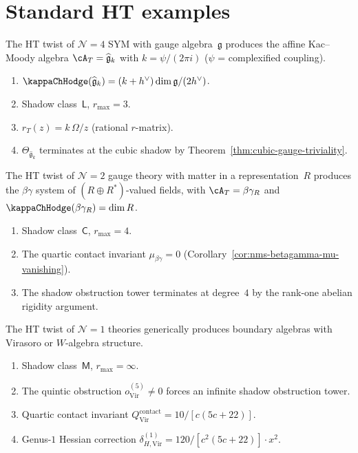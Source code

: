 \section{Standard HT examples}
\label{sec:ht-standard-examples}

\begin{example}[$\mathcal{N}=4$ SYM: affine Kac--Moody]
\label{ex:ht-n4-sym}
The HT twist of $\mathcal{N}=4$ SYM with gauge algebra~$\mathfrak{g}$
produces the affine Kac--Moody algebra
$\cA_T = \widehat{\mathfrak{g}}_k$ with
$k = \psi/(2\pi i)$ ($\psi$ = complexified coupling).
\begin{enumerate}[label=\textup{(\roman*)}]
\item $\kappaChHodge(\widehat{\mathfrak{g}}_k) = (k+h^\vee)\dim\mathfrak{g}/(2h^\vee)$.
\item Shadow class~$\mathsf{L}$, $r_{\max} = 3$.
\item $r_T(z) = k\,\Omega/z$ (rational $r$-matrix).
\item $\Theta_{\widehat{\mathfrak{g}}_k}$ terminates at the cubic
 shadow by Theorem~\ref{thm:cubic-gauge-triviality}.
\end{enumerate}
\end{example}

\begin{example}[$\mathcal{N}=2$ with hypermultiplets: $\beta\gamma$ systems]
\label{ex:ht-n2-hyper}
The HT twist of $\mathcal{N}=2$ gauge theory with matter in a
representation~$R$ produces the $\beta\gamma$ system of
$(R \oplus R^*)$-valued fields, with
$\cA_T = \beta\gamma_R$ and
$\kappaChHodge(\beta\gamma_R) = \dim R$.
\begin{enumerate}[label=\textup{(\roman*)}]
\item Shadow class~$\mathsf{C}$, $r_{\max} = 4$.
\item The quartic contact invariant $\mu_{\beta\gamma} = 0$
 (Corollary~\ref{cor:nms-betagamma-mu-vanishing}).
\item The shadow obstruction tower terminates at degree~$4$ by the rank-one
 abelian rigidity argument.
\end{enumerate}
\end{example}

\begin{example}[$\mathcal{N}=1$: Virasoro/W-type]
\label{ex:ht-n1}
The HT twist of $\mathcal{N}=1$ theories generically produces
boundary algebras with Virasoro or $W$-algebra structure.
\begin{enumerate}[label=\textup{(\roman*)}]
\item Shadow class~$\mathsf{M}$, $r_{\max} = \infty$.
\item The quintic obstruction $o^{(5)}_{\mathrm{Vir}} \neq 0$
 forces an infinite shadow obstruction tower.
\item Quartic contact invariant
 $Q^{\mathrm{contact}}_{\mathrm{Vir}} = 10/[c(5c+22)]$.
\item Genus-$1$ Hessian correction
 $\delta^{(1)}_{H,\mathrm{Vir}} = 120/[c^2(5c+22)] \cdot x^2$.
\end{enumerate}
\end{example}

